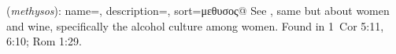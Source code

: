 \item[Drunkenness (women),]

(\textit{methysos}):
{
    name=,
    description={},
    sort=μεθυσος@
}
See , same but about women and wine, specifically the alcohol culture among women.
Found in 1~Cor 5:11, 6:10; Rom 1:29.
